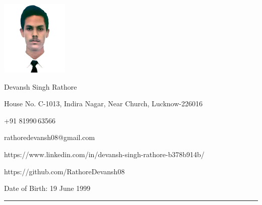 \documentclass[a4paper,10pt]{article}
\newlength{\cvcolumngapwidth}
\newlength{\cvleftcolumnwidth}
\newlength{\cvrightcolumnwidth}
\newcommand{\cvnamestyle}[1]{{\Large\cvnamefont\textcolor{cvnamecolor}{#1}}}
\newcommand{\cvsectionstyle}[1]{{\normalsize\cvsectionfont\textcolor{cvsectioncolor}{#1}}}
\newcommand{\cvtitlestyle}[1]{{\large\cvtitlefont\textcolor{cvtitlecolor}{#1}}}
\newcommand{\cvdurationstyle}[1]{{\small\cvdurationfont\textcolor{cvdurationcolor}{#1}}}
\newlength{\cvafteritemskipamount}
\newlength{\cvaftersectionskipamount}
\newlength{\cvafternameskipamount}
\newlength{\cvafterpersonalinfolineskipamount}
\newlength{\cvaftertitleskipamount}
\newlength{\cvparskip}
\newcommand{\cvpersonalinfo}[2]{
    \begin{minipage}[t]{\cvleftcolumnwidth}
        \vspace{0mm} %
        \raggedleft #1
    \end{minipage}%
    \hspace{\cvcolumngapwidth}%
    \begin{minipage}[t]{\cvrightcolumnwidth}
        \vspace{0mm} %
        #2
    \end{minipage}

    \vspace{\cvafteritemskipamount}
}
\newcommand{\cvname}[1]{
    \cvnamestyle{#1}

    \vspace{\cvafternameskipamount}
}
\newcommand{\cvpersonalinfolinewithicon}[3]{
    \raisebox{.5\fontcharht\font`E-.5\height}{\texttt{[image: \#2]}}
    #3

    \vspace{\cvafterpersonalinfolineskipamount}
}
\newcommand{\cvsection}[1]{
    \begin{minipage}[t]{\cvleftcolumnwidth}
        \raggedleft\cvsectionstyle{#1}
    \end{minipage}%
    \hspace{\cvcolumngapwidth}%
    \begin{minipage}[t]{\cvrightcolumnwidth}
        \textcolor{cvrulecolor}{\rule{\cvrightcolumnwidth}{0.3mm}}
    \end{minipage}

    \vspace{\cvaftersectionskipamount}
}
\newcommand{\cvitem}[2]{
    \begin{minipage}[t]{\cvleftcolumnwidth}
        \raggedleft #1
    \end{minipage}%
    \hspace{\cvcolumngapwidth}%
    \begin{minipage}[t]{\cvrightcolumnwidth}
        \setlength{\parskip}{\cvparskip} #2
    \end{minipage}

    \vspace{\cvafteritemskipamount}
}
\newcommand{\cvtitle}[1]{
    \cvtitlestyle{#1}

    \vspace{\cvaftertitleskipamount}
    \vspace{-\cvparskip}
}
\begin{document}

\cvpersonalinfo{
    \includegraphics[height=36mm]{new.jpg}
}{
    \cvname{Devansh Singh Rathore}

    \cvpersonalinfolinewithicon{height=4mm}{072-location.pdf}{
        House No. C-1013, Indira Nagar, Near Church, Lucknow-226016
    }

    \cvpersonalinfolinewithicon{height=4mm}{067-phone.pdf}{
        +91 81990\,63566\
    }

    \cvpersonalinfolinewithicon{height=4mm}{070-envelop.pdf}{
        rathoredevansh08@gmail.com
    }

    \cvpersonalinfolinewithicon{height=4mm}{458-linkedin.pdf}{
        https://www.linkedin.com/in/devansh-singh-rathore-b378b914b/
    }
    
    \cvpersonalinfolinewithicon{height=4mm}{github.png.pdf}{
        https://github.com/RathoreDevansh08
    }

    Date of Birth:  19 June 1999
}




%




\cvsection{EDUCATION}
\end{document}
